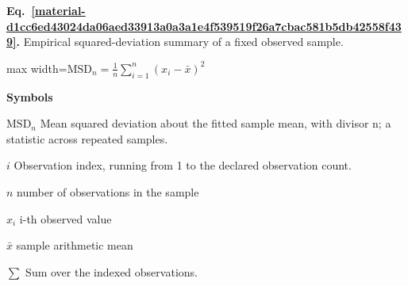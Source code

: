 \documentclass[11pt,a4paper]{article}
\begin{document}
\par\medskip
\begin{samepage}
\label{material-d1cc6ed43024da06aed33913a0a3a1e4f539519f26a7cbac581b5db42558f439}
\noindent\textbf{Eq.~\ref*{material-d1cc6ed43024da06aed33913a0a3a1e4f539519f26a7cbac581b5db42558f439}.} Empirical squared-deviation summary of a fixed observed sample.\par\nopagebreak
\begin{center}\begin{adjustbox}{max width=\linewidth}$\displaystyle \mathrm{MSD}_n=\frac1n{\textstyle\sum_{i=1}^n}(x_i-\bar x)^2$\end{adjustbox}\end{center}

\par\noindent\textbf{Symbols}

\par\noindent\textbf{\(\mathrm{MSD}_n\)} Mean squared deviation about the fitted sample mean, with divisor n; a statistic across repeated samples.

\par\noindent\textbf{\(i\)} Observation index, running from 1 to the declared observation count.

\par\noindent\textbf{\(n\)} number of observations in the sample

\par\noindent\textbf{\(x_i\)} i-th observed value

\par\noindent\textbf{\(\bar{x}\)} sample arithmetic mean

\par\noindent\textbf{\(\sum\)} Sum over the indexed observations.

\end{samepage}
\medskip
\end{document}
